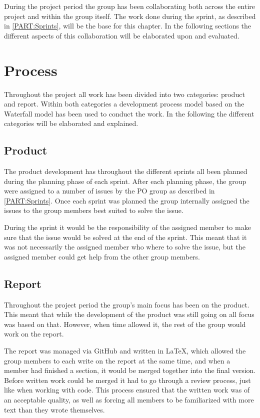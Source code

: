 During the project period the group has been collaborating both across the entire project and within the group itself.
The work done during the sprint, as described in \autoref{PART:Sprints}, will be the base for this chapter.
In the following sections the different aspects of this collaboration will be elaborated upon and evaluated.

\section{Process}
Throughout the project all work has been divided into two categories: product and report.
Within both categories a development process model based on the Waterfall model has been used to conduct the work.
In the following the different categories will be elaborated and explained.

\subsection{Product}
The product development has throughout the different sprints all been planned during the planning phase of each sprint.
After each planning phase, the group were assigned to a number of issues by the PO group as described in \autoref{PART:Sprints}.
Once each sprint was planned the group internally assigned the issues to the group members best suited to solve the issue.

During the sprint it would be the responsibility of the assigned member to make sure that the issue would be solved at the end of the sprint.
This meant that it was not necessarily the assigned member who where to solve the issue, but the assigned member could get help from the other group members.

\subsection{Report}\label{SEC:InternalCollabReport}
Throughout the project period the group's main focus has been on the product.
This meant that while the development of the product was still going on all focus was based on that.
However, when time allowed it, the rest of the group would work on the report.

The report was managed via GitHub and written in \LaTeX, which allowed the group members to each write on the report at the same time, and when a member had finished a section, it would be merged together into the final version.
Before written work could be merged it had to go through a review process, just like when working with code.
This process ensured that the written work was of an acceptable quality, as well as forcing all members to be familiarized with more text than they wrote themselves.

